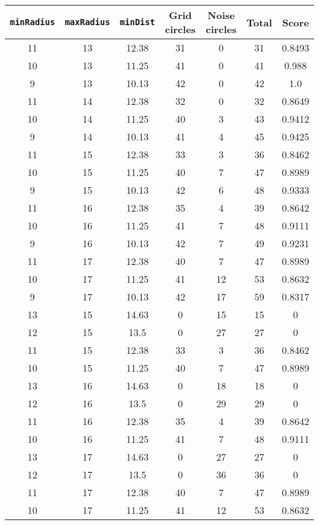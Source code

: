 \documentclass[letterpaper, 12pt]{article}
\begin{document}
\begin{longtable}{|c|c|c|c|c|c|c|}
\hline
\textbf{\texttt{minRadius}} & \textbf{\texttt{maxRadius}} & \textbf{\texttt{minDist}} & \textbf{Grid circles} & \textbf{Noise circles} & \textbf{Total} & \textbf{Score} \\
\hline
11 & 13 & 12.38 & 31 & 0 & 31 & 0.8493 \\
\hline
10 & 13 & 11.25 & 41 & 0 & 41 & 0.988 \\
\hline
9 & 13 & 10.13 & 42 & 0 & 42 & 1.0 \\
\hline
11 & 14 & 12.38 & 32 & 0 & 32 & 0.8649 \\
\hline
10 & 14 & 11.25 & 40 & 3 & 43 & 0.9412 \\
\hline
9 & 14 & 10.13 & 41 & 4 & 45 & 0.9425 \\
\hline
11 & 15 & 12.38 & 33 & 3 & 36 & 0.8462 \\
\hline
10 & 15 & 11.25 & 40 & 7 & 47 & 0.8989 \\
\hline
9 & 15 & 10.13 & 42 & 6 & 48 & 0.9333 \\
\hline
11 & 16 & 12.38 & 35 & 4 & 39 & 0.8642 \\
\hline
10 & 16 & 11.25 & 41 & 7 & 48 & 0.9111 \\
\hline
9 & 16 & 10.13 & 42 & 7 & 49 & 0.9231 \\
\hline
11 & 17 & 12.38 & 40 & 7 & 47 & 0.8989 \\
\hline
10 & 17 & 11.25 & 41 & 12 & 53 & 0.8632 \\
\hline
9 & 17 & 10.13 & 42 & 17 & 59 & 0.8317 \\
\hline
13 & 15 & 14.63 & 0 & 15 & 15 & 0 \\
\hline
12 & 15 & 13.5 & 0 & 27 & 27 & 0 \\
\hline
11 & 15 & 12.38 & 33 & 3 & 36 & 0.8462 \\
\hline
10 & 15 & 11.25 & 40 & 7 & 47 & 0.8989 \\
\hline
13 & 16 & 14.63 & 0 & 18 & 18 & 0 \\
\hline
12 & 16 & 13.5 & 0 & 29 & 29 & 0 \\
\hline
11 & 16 & 12.38 & 35 & 4 & 39 & 0.8642 \\
\hline
10 & 16 & 11.25 & 41 & 7 & 48 & 0.9111 \\
\hline
13 & 17 & 14.63 & 0 & 27 & 27 & 0 \\
\hline
12 & 17 & 13.5 & 0 & 36 & 36 & 0 \\
\hline
11 & 17 & 12.38 & 40 & 7 & 47 & 0.8989 \\
\hline
10 & 17 & 11.25 & 41 & 12 & 53 & 0.8632 \\

\end{longtable}
\end{document}
